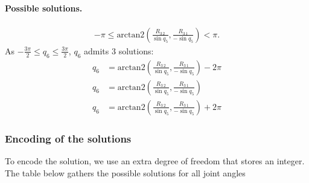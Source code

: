 \documentclass{article}
\begin{document}
\paragraph{Possible solutions.}

\begin{align*}
  -\pi \leq \mbox{arctan2}(\frac{R_{3\,2}}{\sin q_5}, \frac{R_{3\,1}}{-\sin q_5}) < \pi.
\end{align*}
As $-\frac{3\pi}{2} \leq q_6 \leq \frac{3\pi}{2}$, $q_6$ admits 3 solutions:
\begin{align*}
  q_6 &= \mbox{arctan2}(\frac{R_{3\,2}}{\sin q_5}, \frac{R_{3\,1}}{-\sin q_5}) -2\pi \\
  q_6 &= \mbox{arctan2}(\frac{R_{3\,2}}{\sin q_5}, \frac{R_{3\,1}}{-\sin q_5}) \\
  q_6 &= \mbox{arctan2}(\frac{R_{3\,2}}{\sin q_5}, \frac{R_{3\,1}}{-\sin q_5}) + 2\pi
\end{align*}

\subsubsection*{Encoding of the solutions}

To encode the solution, we use an extra degree of freedom that stores an integer. The table below
gathers the possible solutions for all joint angles
\end{document}
